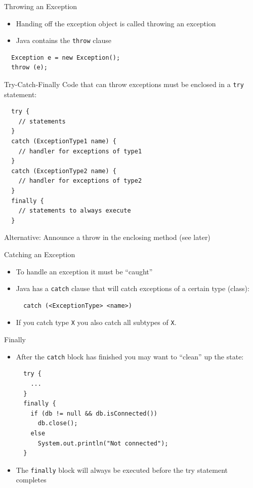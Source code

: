\begin{frame}[fragile]{Throwing an Exception}
  \begin{itemize}
  \item Handing off the exception object is called throwing an
    exception
  \item Java contains the \lstinline!throw! clause
  \end{itemize}


  \begin{lstlisting}
  Exception e = new Exception();
  throw (e);
  \end{lstlisting}
\end{frame}

\begin{frame}[fragile]{Try-Catch-Finally}
  Code that can throw exceptions must be enclosed in a \lstinline!try! 
  statement:
  \begin{lstlisting}
  try {
    // statements
  } 
  catch (ExceptionType1 name) {
    // handler for exceptions of type1
  } 
  catch (ExceptionType2 name) {
    // handler for exceptions of type2
  } 
  finally {
    // statements to always execute
  }
  \end{lstlisting}
  Alternative: Announce a throw in the enclosing method (see later)
\end{frame}

\begin{frame}[fragile]{Catching an Exception}
  \begin{itemize}
  \item To handle an exception it must be ``caught''
  \item Java has a \lstinline!catch! clause that will catch exceptions
    of a certain type (class):
    \begin{lstlisting}
  catch (<ExceptionType> <name>)
    \end{lstlisting}
  \item If you catch type \lstinline!X! you also catch all subtypes of
    \lstinline!X!.
  \end{itemize}
\end{frame}

\begin{frame}[fragile]{Finally}
  \begin{itemize}
  \item After the \lstinline!catch! block has finished you may want to
    ``clean'' up the state:
   \begin{lstlisting}
  try {
    ...
  } 
  finally {
    if (db != null && db.isConnected())
      db.close();
    else
      System.out.println("Not connected");
  }     
   \end{lstlisting}
 \item The \lstinline!finally! block will always be executed before
   the try statement completes
  \end{itemize}
\end{frame}

